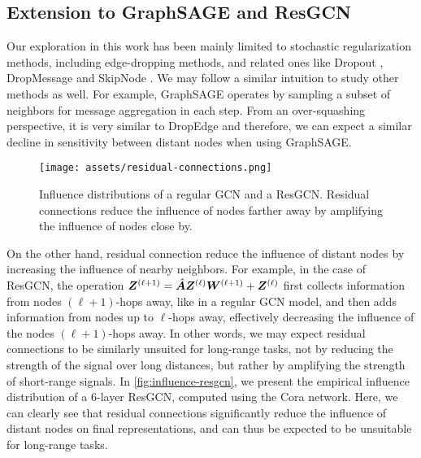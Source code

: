 \subsection{Extension to GraphSAGE and ResGCN}

Our exploration in this work has been mainly limited to stochastic regularization methods, including edge-dropping methods, and related ones like Dropout \cite{srivastava2014dropout}, DropMessage \cite{Fang2022DropMessageUR} and SkipNode \cite{lu2024skipnode}. We may follow a similar intuition to study other methods as well. For example, GraphSAGE \cite{hamilton2017ppi} operates by sampling a subset of neighbors for message aggregation in each step. From an over-squashing perspective, it is very similar to DropEdge and therefore, we can expect a similar decline in sensitivity between distant nodes when using GraphSAGE.

\begin{figure}
    \centering
    \texttt{[image: assets/residual-connections.png]}
    \caption{Influence distributions of a regular GCN and a ResGCN. Residual connections reduce the influence of nodes farther away by amplifying the influence of nodes close by.}
    \label{fig:influence-resgcn}
\end{figure}

On the other hand, residual connection reduce the influence of distant nodes by increasing the influence of nearby neighbors. For example, in the case of ResGCN, the operation $\bm{Z}^{\left(\ell+1\right)} = \hat{\bm{A}} \bm{Z}^{\left(\ell\right)} \bm{W}^{\left(\ell+1\right)} + \bm{Z}^{\left(\ell\right)}$ first collects information from nodes $(\ell+1)$-hops away, like in a regular GCN model, and then adds information from nodes up to $\ell$-hops away, effectively decreasing the influence of the nodes $(\ell+1)$-hops away. In other words, we may expect residual connections to be similarly unsuited for long-range tasks, not by reducing the strength of the signal over long distances, but rather by amplifying the strength of short-range signals. In \autoref{fig:influence-resgcn}, we present the empirical influence distribution \cite{xu2018jknet} of a 6-layer ResGCN, computed using the Cora network. Here, we can clearly see that residual connections significantly reduce the influence of distant nodes on final representations, and can thus be expected to be unsuitable for long-range tasks.